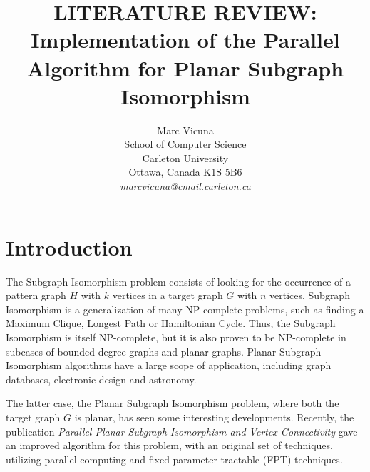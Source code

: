 \documentclass[11pt]{article}       %
\begin{document}


\title{LITERATURE REVIEW: Implementation of the Parallel Algorithm for Planar Subgraph Isomorphism}


\author{
Marc Vicuna\\
School of Computer Science\\
Carleton University\\
Ottawa, Canada K1S 5B6\\
{\em marcvicuna@cmail.carleton.ca}
} %

\maketitle



\section{Introduction} \label{intro}

The Subgraph Isomorphism problem  consists of looking for the occurrence of a pattern graph $H$ with $k$ vertices in a target graph $G$ with $n$ vertices. Subgraph Isomorphism is a generalization of many NP-complete problems, such as finding a Maximum Clique, Longest Path or Hamiltonian Cycle. Thus, the Subgraph Isomorphism is itself NP-complete\cite{NPhard}, but it is also proven to be NP-complete in subcases of bounded degree graphs\cite{bounded} and planar graphs\cite{planar}. Planar Subgraph Isomorphism algorithms have a large scope of application, including graph databases\cite{graphdatabases}, electronic design\cite{electronic} and astronomy\cite{astronomy}.

The latter case, the Planar Subgraph Isomorphism problem, where both the target graph $G$ is planar, has seen some interesting developments. Recently, the publication \textit{Parallel Planar Subgraph Isomorphism and Vertex Connectivity}\cite{lukas2020} gave an improved algorithm for this problem, with an original set of techniques. utilizing parallel computing and fixed-parameter tractable (FPT) techniques. 
\end{document}
